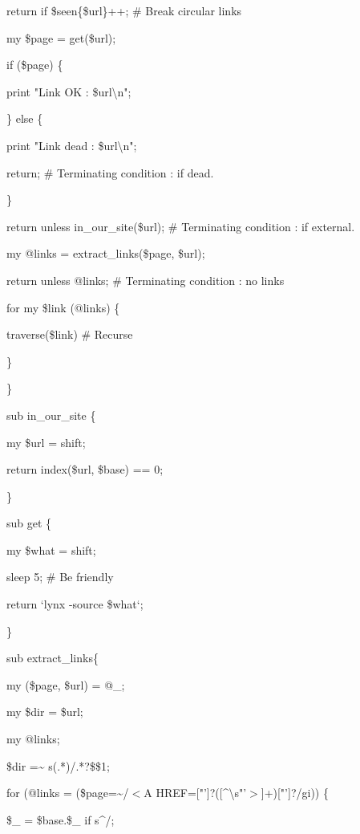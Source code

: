 \documentclass[a4paper,11pt]{book}
\begin{document}
\noindent return if \$seen\{\$url\}++; \# Break circular links

\noindent my \$page = get(\$url);

\noindent if (\$page) \{

\noindent print "Link OK : \$url\textbackslash n";

\noindent \} else \{

\noindent print "Link dead : \$url\textbackslash n";

\noindent return; \# Terminating condition : if dead.

\noindent \}

\noindent return unless in\_our\_site(\$url); \# Terminating condition : if external.

\noindent my @links = extract\_links(\$page, \$url);

\noindent return unless @links; \# Terminating condition : no links

\noindent for my \$link (@links) \{

\noindent traverse(\$link) \# Recurse

\noindent \}

\noindent \}

\noindent 

\noindent sub in\_our\_site \{

\noindent my \$url = shift;

\noindent return index(\$url, \$base) == 0;

\noindent \}

\noindent 

\noindent sub get \{

\noindent my \$what = shift;

\noindent sleep 5; \# Be friendly

\noindent return `lynx -source \$what`;

\noindent \}

\noindent 

\noindent sub extract\_links\{

\noindent my (\$page, \$url) = @\_;

\noindent my \$dir = \$url;

\noindent my @links;

\noindent \$dir =\~{} s\textbar (.*)/.*?\$\textbar \$1\textbar ;

\noindent for (@links = (\$page=\~{}/$<$A HREF=["']?([\^{}\textbackslash s"'$>$]+)["']?/gi)) \{

\noindent \$\_  = \$base.\$\_  if s\textbar \^{}/\textbar \textbar ;
\end{document}
